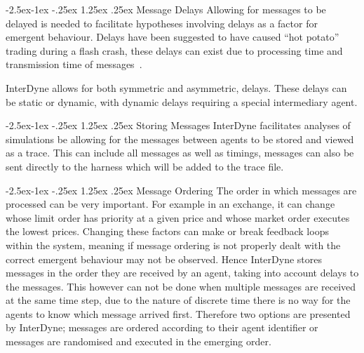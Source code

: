 \documentclass{article}
\makeatletter
\renewcommand\paragraph{\@startsection{paragraph}{4}{\z@}%
	{-2.5ex\@plus -1ex \@minus -.25ex}%
	{1.25ex \@plus .25ex}%
	{\normalfont\normalsize\bfseries}}
\makeatother
\begin{document}
\paragraph{Message Delays}
Allowing for messages to be delayed is needed to facilitate hypotheses involving delays as a factor for emergent behaviour. Delays have been suggested to have caused ``hot potato'' trading during a flash crash, these delays can exist due to processing time and transmission time of messages~\cite{SECreport_delays}.

InterDyne allows for both symmetric and asymmetric, delays. These delays can be static or dynamic, with dynamic delays requiring a special intermediary agent. 

\paragraph{Storing Messages}
InterDyne facilitates analyses of simulations be allowing for the messages between agents to be stored and viewed as a trace. This can include all messages as well as timings, messages can also be sent directly to the harness which will be added to the trace file. 
  
\paragraph{Message Ordering}
The order in which messages are processed can be very important. For example in an exchange, it can change whose limit order has priority at a given price and whose market order executes the lowest prices. Changing these factors can make or break feedback loops within the system, meaning if message ordering is not properly dealt with the correct emergent behaviour may not be observed. Hence InterDyne stores messages in the order they are received by an agent, taking into account delays to the messages. This however can not be done when multiple messages are received at the same time step, due to the nature of discrete time there is no way for the agents to know which message arrived first. Therefore two options are presented by InterDyne; messages are ordered according to their agent identifier or messages are randomised and executed in the emerging order.
\end{document}
